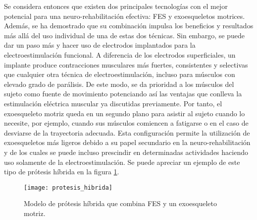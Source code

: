 Se considera entonces que existen dos principales tecnologías con el mejor potencial para una neuro-rehabilitación efectiva: FES y exoesqueletos motrices. Además, se ha demostrado que su combinación impulsa los beneficios y resultados más allá del uso individual de una de estas dos técnicas. Sin embargo, se puede dar un paso más y hacer uso de electrodos implantados para la electroestimulación funcional. A diferencia de los electrodos superficiales, un implante produce contracciones musculares más fuertes, consistentes y selectivas que cualquier otra técnica de electroestimulación, incluso para músculos con elevado grado de parálisis. De este modo, se da prioridad a los músculos del sujeto como fuente de movimiento potenciando así las ventajas que conlleva la estimulación eléctrica muscular ya discutidas previamente. Por tanto, el exoesqueleto motriz queda en un segundo plano para asistir al sujeto cuando lo necesite, por ejemplo, cuando sus músculos comiencen a fatigarse o en el caso de desviarse de la trayectoria adecuada. Esta configuración permite la utilización de exoesqueletos más ligeros debido a su papel secundario en la neuro-rehabilitación y de los cuales se puede incluso prescindir en determinadas actividades haciendo uso solamente de la electroestimulación. Se puede apreciar un ejemplo de este tipo de prótesis híbrida en la figura \ref{fig:protesis_hibrida}.\\

\begin{figure}[!htb]
\centering
\texttt{[image: protesis\_hibrida]}
  \caption{Modelo de prótesis híbrida que combina FES y un exoesqueleto motriz\cite{protesis_hibridas}.}\label{fig:protesis_hibrida}
\end{figure}

